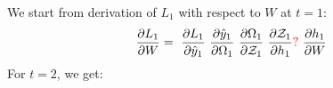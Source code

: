 \documentclass{article}
\begin{document}
We start from derivation of $L_1$ with respect to $W$ at $t=1$:
\begin{align*}
\frac{\partial L_1}{ \partial{W}} & = ~\frac{\partial L_1}{ \partial \hat{y}_1}~\frac{\partial \hat{y}_1}{ \partial \Omega_1}~\frac{\partial \Omega_1}{\partial \mathcal{Z}_1}~\frac{\partial \mathcal{Z}_1}{ \partial h_1} \textcolor{red}{?}
 ~\frac{\partial h_1}{ \partial W} \\
\end{align*}
For $t=2$, we get:
\end{document}
